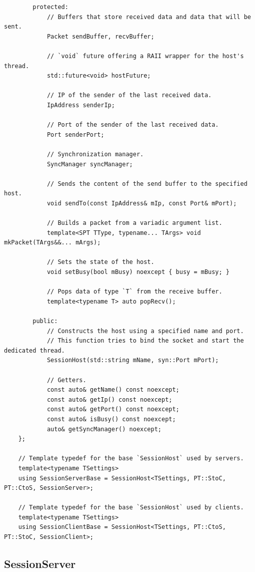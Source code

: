 \documentclass{report}
\begin{document}
\begin{verbatim}
        protected:
            // Buffers that store received data and data that will be sent.
            Packet sendBuffer, recvBuffer;

            // `void` future offering a RAII wrapper for the host's thread.
            std::future<void> hostFuture;

            // IP of the sender of the last received data.
            IpAddress senderIp;
            
            // Port of the sender of the last received data.
            Port senderPort;
            
            // Synchronization manager.
            SyncManager syncManager;

            // Sends the content of the send buffer to the specified host.
            void sendTo(const IpAddress& mIp, const Port& mPort);

            // Builds a packet from a variadic argument list.
            template<SPT TType, typename... TArgs> void mkPacket(TArgs&&... mArgs);

            // Sets the state of the host.
            void setBusy(bool mBusy) noexcept { busy = mBusy; }

            // Pops data of type `T` from the receive buffer.
            template<typename T> auto popRecv();

        public:
            // Constructs the host using a specified name and port.
            // This function tries to bind the socket and start the dedicated thread.
            SessionHost(std::string mName, syn::Port mPort);

            // Getters.
            const auto& getName() const noexcept;
            const auto& getIp() const noexcept;
            const auto& getPort() const noexcept;
            const auto& isBusy() const noexcept;
            auto& getSyncManager() noexcept;
    };

    // Template typedef for the base `SessionHost` used by servers.
    template<typename TSettings> 
    using SessionServerBase = SessionHost<TSettings, PT::StoC, PT::CtoS, SessionServer>;

    // Template typedef for the base `SessionHost` used by clients.
    template<typename TSettings> 
    using SessionClientBase = SessionHost<TSettings, PT::CtoS, PT::StoC, SessionClient>;
\end{verbatim}

            \subsection{SessionServer}
\end{document}
